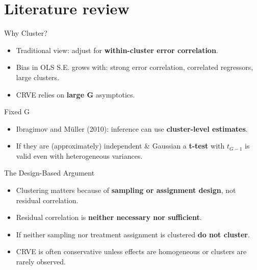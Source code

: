 \documentclass[
  ignorenonframetext,
]{beamer}
\providecommand{\tightlist}{%
  \setlength{\itemsep}{0pt}\setlength{\parskip}{0pt}}
\begin{document}
\begin{frame}
\end{frame}

\section{Literature review}\label{literature-review}

\begin{frame}{Why Cluster?}
\label{why-cluster}
\begin{itemize}
\tightlist
\item
  Traditional view: adjust for \textbf{within-cluster error
  correlation}.\\
\item
  Bias in OLS S.E. grows with: strong error correlation, correlated
  regressors, large clusters.\\
\item
  CRVE relies on \textbf{large G} asymptotics.
\end{itemize}
\end{frame}

\begin{frame}{Fixed G}
\label{fixed-g}
\begin{itemize}
\tightlist
\item
  Ibragimov and Müller (2010): inference can use \textbf{cluster-level
  estimates}.\\
\item
  If they are (approximately) independent \& Gaussian a \textbf{t-test}
  with \(t_{G−1}\) is valid even with heterogeneous variances.
\end{itemize}
\end{frame}

\begin{frame}{The Design-Based Argument}
\label{the-design-based-argument}
\begin{itemize}
\tightlist
\item
  Clustering matters because of \textbf{sampling or assignment design},
  not residual correlation.\\
\item
  Residual correlation is \textbf{neither necessary nor sufficient}.\\
\item
  If neither sampling nor treatment assignment is clustered \textbf{do
  not cluster}.\\
\item
  CRVE is often conservative unless effects are homogeneous or clusters
  are rarely observed.
\end{itemize}
\end{frame}
\end{document}
